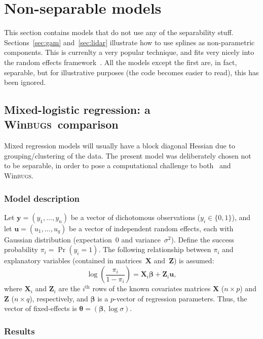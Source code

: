 \documentclass{admbmanual}
\newcommand{\scWinBUGS}{Win\textsc{bugs}}
\begin{document}
\section{Non-separable models}

This section contains models that do not use any of the separability stuff.
Sections~\ref{sec:gam} and~\ref{sec:lidar} illustrate how to use splines as
non-parametric components. This is currenlty a very popular technique, and fits
very nicely into the random effects framework~\cite{rupp:wand:carr:2003}. All
the models except the first are, in fact, separable, but for illustrative
purposes (the code becomes easier to read), this has been ignored.

\subsection{Mixed-logistic regression: a \scWinBUGS\ comparison}
\label{sec:logistic_example}

Mixed regression models will usually have a block diagonal Hessian due to
grouping/clustering of the data. The present model was deliberately chosen not
to be separable, in order to pose a computational challenge to both \scAR\ and
\scWinBUGS.

\subsubsection{Model description}

Let $\mathbf{y}=(y_1,\ldots,y_n)$ be a vector of dichotomous observations
($y_i\in\{0,1\}$), and let $\mathbf{u}=(u_1,\ldots,u_q)$ be a vector of
independent random effects, each with Gaussian distribution (expectation~$0$ and
variance~$\sigma^2$). Define the success probability $\pi_i=\Pr(y_i=1)$. The
following relationship between $\pi_i$ and explanatory variables (contained in
matrices~$\mathbf{X}$ and~$\mathbf{Z}$) is assumed:
\[
  \log\left(\frac{\pi_i}{1-\pi_i}\right) = \mathbf{X}_i\mathbf{\beta} +
  \mathbf{Z}_i\mathbf{u},
\]
where $\mathbf{X}_i$ and $\mathbf{Z}_i$ are the $i^{\textrm{th}}$ rows of the
known covariates matrices $\mathbf{X}$ ($n\times p$) and $\mathbf{Z}$ ($n\times
q$), respectively, and $\mathbf{\beta}$ is a $p$-vector of regression
parameters. Thus, the vector of fixed-effects is
$\mathbf{\theta}=(\mathbf{\beta},\log\sigma)$.

\subsubsection{Results}
\end{document}
